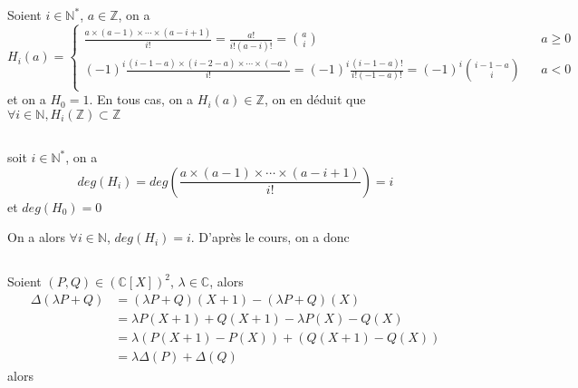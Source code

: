 \documentclass[a4paper,12pt]{book}
\begin{document}
\renewcommand{\labelitemi}{$\blacktriangleright$}
\renewcommand{\labelitemii}{$\bullet$}


\section{}
\subsection{}
Soient $i \in \mathbb{N}^*$, $a \in \mathbb{Z}$, on a 
\begin{equation}  \nonumber
    H_i(a)=\left\{  
                 \begin{array}{rcl}  
                    \frac{a\times(a-1)\times \cdots \times(a-i+1)}{i!}=\frac{a!}{i!(a-i)!}=\binom{a}{i} & & a \geq 0\\
                    (-1)^i \frac{(i-1-a)\times (i-2-a)\times \cdots \times (-a)}{i!}=(-1)^i\frac{(i-1-a)!}{i!(-1-a)!}=(-1)^i\binom{i-1-a}{i} & & a<0\\
                 \end{array}  
    \right.  
\end{equation}
et on a $H_0=1$. En tous cas, on a $H_i(a) \in \mathbb{Z}$, on en déduit que $\boxed{\forall i \in \mathbb{N}, H_i(\mathbb{Z})\subset \mathbb{Z}}$
\subsection{}
soit $i \in \mathbb{N}^*$, on a 
$$
deg(H_i)=deg(\frac{a\times(a-1)\times \cdots \times(a-i+1)}{i!})=i
$$
et $deg(H_0)=0$

On a alors $\forall i \in \mathbb{N}$, $deg(H_i)=i$. D'après le cours, on a donc 
\subsection{}
Soient $(P,Q) \in (\mathbb{C}[X])^2$, $\lambda \in \mathbb{C}$, alors 
\begin{align*}
\Delta(\lambda P+Q) &=(\lambda P+Q)(X+1)-(\lambda P+Q)(X)\\
&=\lambda P(X+1)+Q(X+1)-\lambda P(X)-Q(X)\\
&=\lambda (P(X+1)-P(X))+(Q(X+1)-Q(X))\\
&=\lambda \Delta(P)+\Delta(Q)
\end{align*}
alors 
\end{document}
